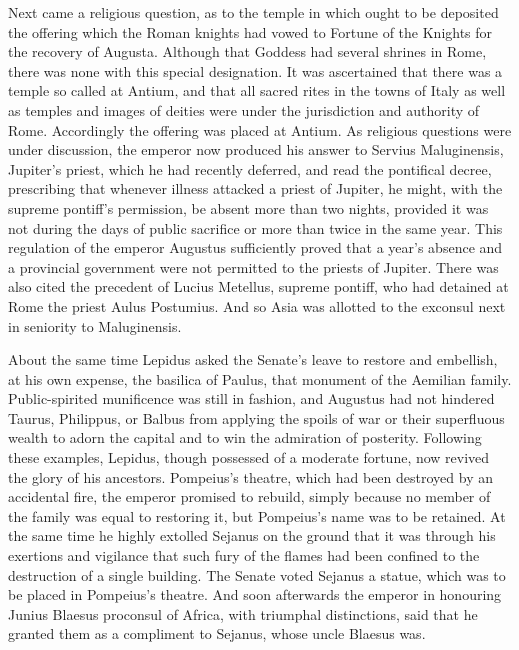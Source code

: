 
Next came a religious question, as to the temple in which ought to be deposited the offering which the Roman knights had vowed to Fortune of the Knights for the recovery of Augusta. Although that Goddess had several shrines in Rome, there was none with this special designation. It was ascertained that there was a temple so called at Antium, and that all sacred rites in the towns of Italy as well as temples and images of deities were under the jurisdiction and authority of Rome. Accordingly the offering was placed at Antium. As religious questions were under discussion, the emperor now produced his answer to Servius Maluginensis, Jupiter's priest, which he had recently deferred, and read the pontifical decree, prescribing that whenever illness attacked a priest of Jupiter, he might, with the supreme pontiff's permission, be absent more than two nights, provided it was not during the days of public sacrifice or more than twice in the same year. This regulation of the emperor Augustus sufficiently proved that a year's absence and a provincial government were not permitted to the priests of Jupiter. There was also cited the precedent of Lucius Metellus, supreme pontiff, who had detained at Rome the priest Aulus Postumius. And so Asia was allotted to the exconsul next in seniority to Maluginensis.


About the same time Lepidus asked the Senate's leave to restore and embellish, at his own expense, the basilica of Paulus, that monument of the Aemilian family. Public-spirited munificence was still in fashion, and Augustus had not hindered Taurus, Philippus, or Balbus from applying the spoils of war or their superfluous wealth to adorn the capital and to win the admiration of posterity. Following these examples, Lepidus, though possessed of a moderate fortune, now revived the glory of his ancestors. Pompeius's theatre, which had been destroyed by an accidental fire, the emperor promised to rebuild, simply because no member of the family was equal to restoring it, but Pompeius's name was to be retained. At the same time he highly extolled Sejanus on the ground that it was through his exertions and vigilance that such fury of the flames had been confined to the destruction of a single building. The Senate voted Sejanus a statue, which was to be placed in Pompeius's theatre. And soon afterwards the emperor in honouring Junius Blaesus proconsul of Africa, with triumphal distinctions, said that he granted them as a compliment to Sejanus, whose uncle Blaesus was.

